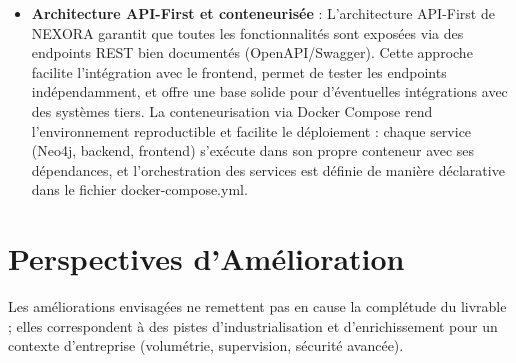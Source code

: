\documentclass[12pt,a4paper]{report}
\begin{document}
\begin{itemize}
  \item \textbf{Architecture API-First et conteneurisée} : L'architecture API-First de NEXORA garantit que toutes les fonctionnalités sont exposées via des endpoints REST bien documentés (OpenAPI/Swagger). Cette approche facilite l'intégration avec le frontend, permet de tester les endpoints indépendamment, et offre une base solide pour d'éventuelles intégrations avec des systèmes tiers. La conteneurisation via Docker Compose rend l'environnement reproductible et facilite le déploiement : chaque service (Neo4j, backend, frontend) s'exécute dans son propre conteneur avec ses dépendances, et l'orchestration des services est définie de manière déclarative dans le fichier docker-compose.yml.
\end{itemize}

\section{Perspectives d'Amélioration}
Les améliorations envisagées ne remettent pas en cause la complétude du livrable ; elles correspondent à des pistes d'industrialisation et d'enrichissement pour un contexte d'entreprise (volumétrie, supervision, sécurité avancée).
\end{document}
